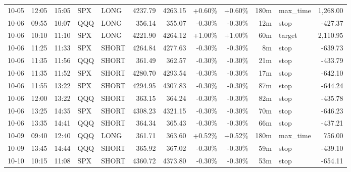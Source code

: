 \documentclass[11pt,a4paper,twoside]{article}
\begin{document}
\begin{center}
\begin{longtable}{>{\color{txtmain}}l l l l l r r r r r >{\color{txtmain}}l r}
10-05 & 12:05 & 15:05 & SPX & LONG & 4237.79 & 4263.15 & \textcolor{wingreen}{+0.60\%} & \textcolor{wingreen}{+0.60\%} & 180m & max\_time & \textcolor{wingreen}{1,268.00} \\
10-06 & 09:55 & 10:07 & QQQ & LONG & 356.14 & 355.07 & \textcolor{lossred}{-0.30\%} & \textcolor{lossred}{-0.30\%} & 12m & stop & \textcolor{lossred}{-427.37} \\
10-06 & 10:10 & 11:10 & SPX & LONG & 4221.90 & 4264.12 & \textcolor{wingreen}{+1.00\%} & \textcolor{wingreen}{+1.00\%} & 60m & target & \textcolor{wingreen}{2,110.95} \\
10-06 & 11:25 & 11:33 & SPX & SHORT & 4264.84 & 4277.63 & \textcolor{lossred}{-0.30\%} & \textcolor{lossred}{-0.30\%} & 8m & stop & \textcolor{lossred}{-639.73} \\
10-06 & 11:35 & 11:56 & QQQ & SHORT & 361.49 & 362.57 & \textcolor{lossred}{-0.30\%} & \textcolor{lossred}{-0.30\%} & 21m & stop & \textcolor{lossred}{-433.79} \\
10-06 & 11:35 & 11:52 & SPX & SHORT & 4280.70 & 4293.54 & \textcolor{lossred}{-0.30\%} & \textcolor{lossred}{-0.30\%} & 17m & stop & \textcolor{lossred}{-642.10} \\
10-06 & 11:55 & 13:22 & SPX & SHORT & 4294.95 & 4307.83 & \textcolor{lossred}{-0.30\%} & \textcolor{lossred}{-0.30\%} & 87m & stop & \textcolor{lossred}{-644.24} \\
10-06 & 12:00 & 13:22 & QQQ & SHORT & 363.15 & 364.24 & \textcolor{lossred}{-0.30\%} & \textcolor{lossred}{-0.30\%} & 82m & stop & \textcolor{lossred}{-435.78} \\
10-06 & 13:25 & 14:35 & SPX & SHORT & 4308.23 & 4321.15 & \textcolor{lossred}{-0.30\%} & \textcolor{lossred}{-0.30\%} & 70m & stop & \textcolor{lossred}{-646.23} \\
10-06 & 13:35 & 14:41 & QQQ & SHORT & 364.34 & 365.43 & \textcolor{lossred}{-0.30\%} & \textcolor{lossred}{-0.30\%} & 66m & stop & \textcolor{lossred}{-437.21} \\
10-09 & 09:40 & 12:40 & QQQ & LONG & 361.71 & 363.60 & \textcolor{wingreen}{+0.52\%} & \textcolor{wingreen}{+0.52\%} & 180m & max\_time & \textcolor{wingreen}{756.00} \\
10-09 & 13:45 & 14:44 & QQQ & SHORT & 365.92 & 367.02 & \textcolor{lossred}{-0.30\%} & \textcolor{lossred}{-0.30\%} & 59m & stop & \textcolor{lossred}{-439.10} \\
10-10 & 10:15 & 11:08 & SPX & SHORT & 4360.72 & 4373.80 & \textcolor{lossred}{-0.30\%} & \textcolor{lossred}{-0.30\%} & 53m & stop & \textcolor{lossred}{-654.11} \\

\end{longtable}
\end{center}
\end{document}
